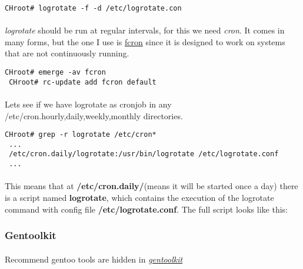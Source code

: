 \documentclass[10pt,a4paper]{article}
\begin{document}
                    \begin{lstlisting}[style=BashInputCHRoot]
 CHroot# logrotate -f -d /etc/logrotate.con
                    \end{lstlisting}

                    \paragraph{} \textit{logrotate} should be run at regular intervals, for this we need \textit{cron}. It comes in many forms, but the one I use is \href{https://wiki.gentoo.org/wiki/Cron#fcron}{fcron} since it is designed to work on systems that are not continuously running.

                    \begin{lstlisting}[style=BashInputCHRoot]
 CHroot# emerge -av fcron
 CHroot# rc-update add fcron default
                    \end{lstlisting}

                    \paragraph{} Lets see if we have logrotate as cronjob in any /etc/cron.{hourly,daily,weekly,monthly} directories.

                    \begin{lstlisting}[style=BashInputCHRoot]
 CHroot# grep -r logrotate /etc/cron*
 ...
 /etc/cron.daily/logrotate:/usr/bin/logrotate /etc/logrotate.conf
 ...
                    \end{lstlisting}

                    \paragraph{} This means that at \textbf{/etc/cron.daily/}(means it will be started once a day) there is a script named \textbf{logrotate}, which contains the execution of the logrotate command with config file \textbf{/etc/logrotate.conf}. The full script looks like this:



                \newpage
                \subsubsection{Gentoolkit}

                    \paragraph{} Recommend gentoo tools are hidden in \href{https://wiki.gentoo.org/wiki/Gentoolkit}{\textit{gentoolkit}}
\end{document}
